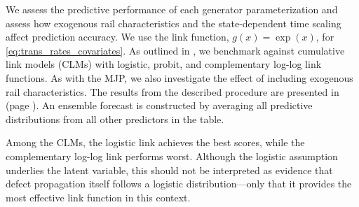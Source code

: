 We assess the predictive performance of each generator parameterization and assess how exogenous rail characteristics and the state-dependent time scaling affect prediction accuracy. We use the link function, $g(x) = \exp(x)$, for \cref{eq:trans_rates_covariates}. 
As outlined in , we benchmark against cumulative link models (CLMs) with logistic, probit, and complementary log-log link functions. As with the MJP, we also investigate the effect of including exogenous rail characteristics.
The results from the described procedure are presented in  (page \pageref{tab:forecast_error_tab}). An ensemble forecast is constructed by averaging all predictive distributions from all other predictors in the table.

\begin{table}[htb!]
    \centering
    \caption{Prediction errors from $k$-fold cross-prediction procedures in terms of average ranked probability score ($\overline{\text{RPS}}$) and average log score ($\overline{\text{LogS}}$). ``Exogeneous information'' refers to whether or not the rail characteristics described in  are included in the model.}

    \label{tab:forecast_error_tab}
\end{table}


Among the CLMs, the logistic link achieves the best scores, while the complementary log-log link performs worst. Although the logistic assumption underlies the latent variable, this should not be interpreted as evidence that defect propagation itself follows a logistic distribution—only that it provides the most effective link function in this context.

